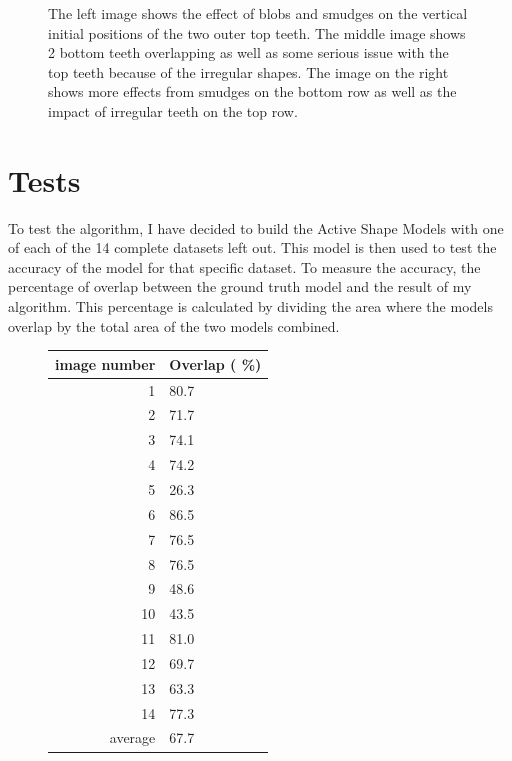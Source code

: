 \documentclass[a4paper,10pt]{article}
\begin{document}
\begin{figure}[!h]
\begin{tabular}{ccc}
\end{tabular}
 \caption{The left image shows the effect of blobs and smudges on the vertical initial positions of the two outer top teeth. The middle image shows 2 bottom teeth overlapping as well as some serious issue with the top teeth because of the irregular shapes. The image on the right shows more effects from smudges on the bottom row as well as the impact of irregular teeth on the top row. }
\end{figure}

\section{Tests}
To test the algorithm, I have decided to build the Active Shape Models with one of each of the 14 complete datasets left out. This model is then used to test the accuracy of the model for that specific dataset. To measure the accuracy, the percentage of overlap between the ground truth model and the result of my algorithm. This percentage is calculated by dividing the area where the models overlap by the total area of the two models combined.

\begin{figure}[!h]
\centering
\begin{tabular}{r|l}
image number & Overlap ( \%) \\
\hline
1 & 80.7	\\
2 & 71.7	\\
3 & 74.1	\\
4 & 74.2	\\
5 & 26.3	\\
6 & 86.5	\\
7 & 76.5	\\
8 & 76.5	\\
9 & 48.6	\\
10 & 43.5	\\
11 & 81.0	\\
12 & 69.7	\\
13 & 63.3	\\
14 & 77.3	\\
\hline
average & 67.7
\end{tabular}
\end{figure}
\end{document}
